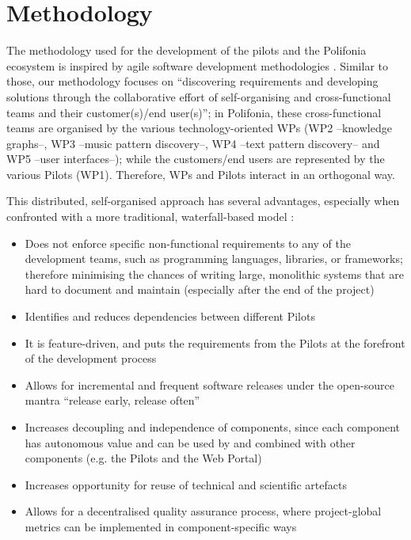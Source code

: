 \chapter{Methodology}\label{ch:methodology}

The methodology used for the development of the pilots and the Polifonia ecosystem is inspired by agile software development methodologies \cite{collier2012agile}. Similar to those, our methodology focuses on ``discovering requirements and developing solutions through the collaborative effort of self-organising and cross-functional teams and their customer(s)/end user(s)''; in Polifonia, these cross-functional teams are organised by the various technology-oriented WPs (WP2 --knowledge graphs--, WP3 --music pattern discovery--, WP4 --text pattern discovery-- and WP5 --user interfaces--); while the customers/end users are represented by the various Pilots (WP1). Therefore, WPs and Pilots interact in an orthogonal way.

This distributed, self-organised approach has several advantages, especially when confronted with a more traditional, waterfall-based model \cite{benington1983production}:

\begin{itemize}
    \item Does not enforce specific non-functional requirements to any of the development teams, such as programming languages, libraries, or frameworks; therefore minimising the chances of writing large, monolithic systems that are hard to document and maintain (especially after the end of the project)
    \item Identifies and reduces dependencies between different Pilots
    \item It is feature-driven, and puts the requirements from the Pilots at the forefront of the development process
    \item Allows for incremental and frequent software releases under the open-source mantra ``release early, release often''
    \item Increases decoupling and independence of components, since each component has autonomous value and can be used by and combined with other components (e.g. the Pilots and the Web Portal)
    \item Increases opportunity for reuse of technical and scientific artefacts
    \item Allows for a decentralised quality assurance process, where project-global metrics can be implemented in component-specific ways
\end{itemize}


